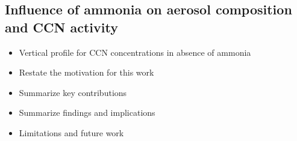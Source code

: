 \documentclass[journal abbreviation, manuscript]{copernicus}
\begin{document}
\subsection{Influence of ammonia on aerosol composition and CCN activity}
\begin{itemize}
\item Vertical profile for CCN concentrations in absence of ammonia 
\end{itemize}

\conclusions  %
\begin{itemize}
\item Restate the motivation for this work
\item Summarize key contributions
\item Summarize findings and implications
\item Limitations and future work
\end{itemize}












\appendix
\section{}    %

\subsection{}     %


\noappendix       %
\end{document}
